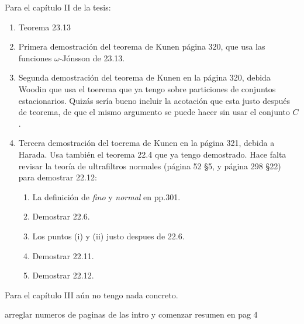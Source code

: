 \documentclass[12pt]{article}
\begin{document}
Para el capítulo II de la tesis:

\begin{enumerate}
    \item Teorema 23.13
    \item Primera demostración del teorema de Kunen página 320, que usa
        las funciones $\omega$-Jónsson de 23.13.
    \item Segunda demostración del teorema de Kunen en la página 320, debida Woodin que usa
        el toerema que ya tengo sobre particiones de conjuntos estacionarios.
        Quizás sería bueno incluir la acotación que esta justo después de teorema,
        de que el mismo argumento se puede hacer sin usar el conjunto $C$.
    \item Tercera demostración del toerema de Kunen en la página 321, debida a Harada.
        Usa también el teorema 22.4 que ya tengo demostrado.
        Hace falta revisar la teoría de ultrafiltros normales (página 52 \S5, y página 298 \S22)
        para demostrar 22.12:
        \begin{enumerate}
            \item La definición de \emph{fino} y \emph{normal} en pp.301.
            \item Demostrar 22.6.
            \item Los puntos (i) y (ii) justo despues de 22.6.
            \item Demostrar 22.11.
            \item Demostrar 22.12.
        \end{enumerate}
\end{enumerate}

Para el capítulo III aún no tengo nada concreto.

arreglar numeros de paginas de las intro y comenzar resumen en pag 4
\end{document}
